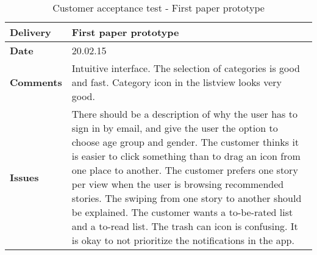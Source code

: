 \renewcommand{\arraystretch}{2}%
\begin{center}
	\small
	\begin{longtable}{ | p{4cm} | p{13cm} | }
		
		\caption[Customer acceptance test - First paper prototype]{Customer acceptance test - First paper prototype} \label{Tab:cattest1}\\
		\hline
		\textbf{Delivery} & First paper prototype\\ \hline
		\textbf{Date} & 20.02.15 \\ \hline 
		\textbf{Comments} &Intuitive interface. The selection of categories is good and fast. Category icon in the listview looks very good.
		\\ \hline
		\textbf{Issues} &
		There should be a description of why the user has to sign in by email, and give the user the option to choose age group and gender. The customer thinks it is easier to click something than to drag an icon from one place to another.  The customer prefers one story per view when the user is browsing recommended stories. The swiping from one story to another should be explained. The customer wants a to-be-rated list and a to-read list. The trash can icon is confusing. It is okay to not prioritize the notifications in the app. 	
		\\ \hline
		
	\end{longtable}
\end{center}

